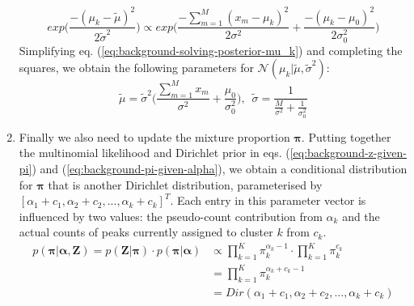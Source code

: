 \begin{enumerate}
\begin{equation}
exp\bigg(\frac{-(\mu_k-\tilde{\mu})^2}{2\tilde{\sigma}^2} \bigg) \propto exp\bigg(\frac{-\sum_{m=1}^{M} (x_m-\mu_k)^2}{2\sigma^2} + \frac{-(\mu_k-\mu_0)^2}{2\sigma_0^2}\bigg)
\label{eq:background-solving-posterior-mu_k}
\end{equation}
Simplifying eq. (\ref{eq:background-solving-posterior-mu_k}) and completing the squares, we obtain the following parameters for $\mathcal{N}(\mu_k \vert \tilde{\mu}, \tilde{\sigma}^2)$:
\begin{equation}
\tilde{\mu} = \tilde{\sigma}^2 \bigg( \frac{\sum_{m=1}^{M} x_m}{\sigma^2} + \frac{\mu_0}{\sigma_0^2} \bigg), \enspace
\tilde{\sigma} = \frac{1}{\frac{M}{\sigma^2} + \frac{1}{\sigma^2_0}} 
\label{eq:background-tilde-mu-sigma}
\end{equation}

\item Finally we also need to update the mixture proportion $\boldsymbol{\pi}$. Putting together the multinomial likelihood and Dirichlet prior in eqs. (\ref{eq:background-z-given-pi}) and (\ref{eq:background-pi-given-alpha}), we obtain a conditional distribution for $\boldsymbol{\pi}$ that is another Dirichlet distribution, parameterised by $[\alpha_{1}+c_{1}, \alpha_{2}+c_{2}, ..., \alpha_{k}+c_{k}]^T$. Each entry in this parameter vector is influenced by two values: the pseudo-count contribution from $\alpha_k$ and the actual counts of peaks currently assigned to cluster $k$ from $c_k$. 
\begin{equation}
\begin{aligned}
p(\boldsymbol{\pi} \vert \boldsymbol{\alpha}, \boldsymbol{Z}) = p(\boldsymbol{Z} \vert \boldsymbol{\pi}) \cdot p(\boldsymbol{\pi} \vert \boldsymbol{\alpha})
                                                                                                &\propto \prod_{k=1}^{K} \pi_k^{\alpha_{k}-1} \cdot \prod_{k=1}^{K} \pi_k^{c_{k}}  \\
                                                                                                &= \prod_{k=1}^{K} \pi_k^{\alpha_{k}+c_{k}-1} \\
                                                                                                &= Dir(\alpha_{1}+c_{1}, \alpha_{2}+c_{2}, ..., \alpha_{k}+c_{k})
\end{aligned}
\label{eq:background-mixture-conditional-pi}
\end{equation}

\end{enumerate}

